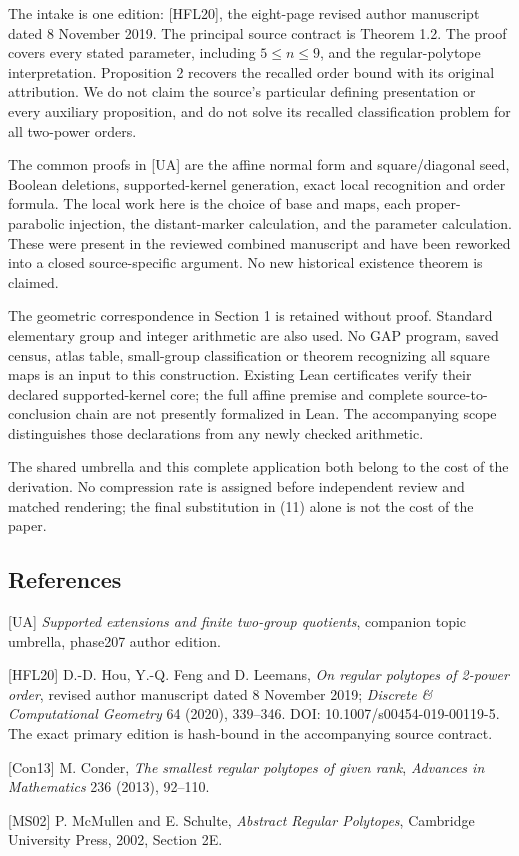 \documentclass[
  11pt,
  a4paper,
]{article}
\begin{document}
The intake is one edition: {[}HFL20{]}, the eight-page revised author
manuscript dated 8 November 2019. The principal source contract is
Theorem 1.2. The proof covers every stated parameter, including
\(5\le n\le9\), and the regular-polytope interpretation. Proposition 2
recovers the recalled order bound with its original attribution. We do
not claim the source's particular defining presentation or every
auxiliary proposition, and do not solve its recalled classification
problem for all two-power orders.

The common proofs in {[}UA{]} are the affine normal form and
square/diagonal seed, Boolean deletions, supported-kernel generation,
exact local recognition and order formula. The local work here is the
choice of base and maps, each proper-parabolic injection, the
distant-marker calculation, and the parameter calculation. These were
present in the reviewed combined manuscript and have been reworked into
a closed source-specific argument. No new historical existence theorem
is claimed.

The geometric correspondence in Section 1 is retained without proof.
Standard elementary group and integer arithmetic are also used. No GAP
program, saved census, atlas table, small-group classification or
theorem recognizing all square maps is an input to this construction.
Existing Lean certificates verify their declared supported-kernel core;
the full affine premise and complete source-to-conclusion chain are not
presently formalized in Lean. The accompanying scope distinguishes those
declarations from any newly checked arithmetic.

The shared umbrella and this complete application both belong to the
cost of the derivation. No compression rate is assigned before
independent review and matched rendering; the final substitution in (11)
alone is not the cost of the paper.

\subsection{References}\label{references}

{[}UA{]} \emph{Supported extensions and finite two-group quotients},
companion topic umbrella, phase207 author edition.

{[}HFL20{]} D.-D. Hou, Y.-Q. Feng and D. Leemans, \emph{On regular
polytopes of 2-power order}, revised author manuscript dated 8 November
2019; \emph{Discrete \& Computational Geometry} 64 (2020), 339--346.
DOI: 10.1007/s00454-019-00119-5. The exact primary edition is hash-bound
in the accompanying source contract.

{[}Con13{]} M. Conder, \emph{The smallest regular polytopes of given
rank}, \emph{Advances in Mathematics} 236 (2013), 92--110.

{[}MS02{]} P. McMullen and E. Schulte, \emph{Abstract Regular
Polytopes}, Cambridge University Press, 2002, Section 2E.
\end{document}
